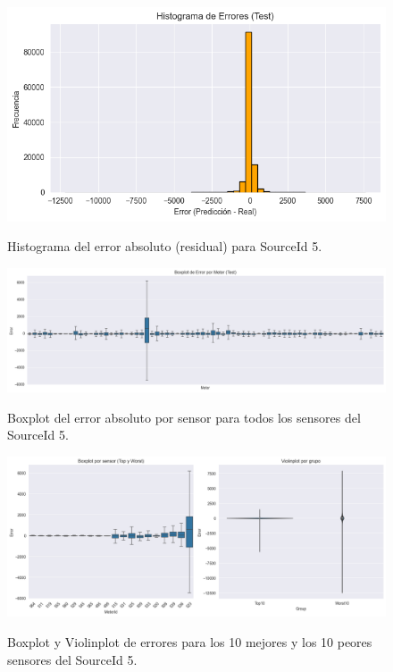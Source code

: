 \begin{figure}[H]
	\centering
	\caption{Histograma del error absoluto (residual) para SourceId 5.}
	\includegraphics[width=0.75\linewidth]{includes/cap5/graphs/advanced/sid5_error_histogram_predicted_vs_actual.png}
	\label{fig:sid5_histograma_error}
\end{figure}

\begin{figure}[H]
	\centering
	\caption{Boxplot del error absoluto por sensor para todos los sensores del SourceId 5.}
	\includegraphics[width=0.75\linewidth]{includes/cap5/graphs/advanced/sid5_all_meters_error_boxplot.png}
	\label{fig:sid5_boxplot_all}
\end{figure}

\begin{figure}[H]
	\centering
	\caption{Boxplot y Violinplot de errores para los 10 mejores y los 10 peores sensores del SourceId 5.}
	\includegraphics[width=0.75\linewidth]{includes/cap5/graphs/advanced/sid5_10best_10worst_meter_boxplot_violinplot.png}
	\label{fig:sid5_violinplot_best_worst}
\end{figure}

